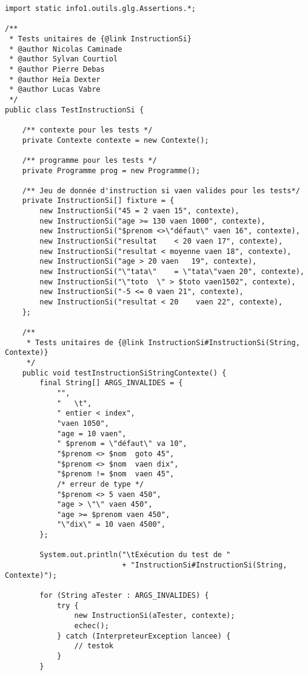 \begin{enum}
\begin{verbatim}
import static info1.outils.glg.Assertions.*;

/**
 * Tests unitaires de {@link InstructionSi}
 * @author Nicolas Caminade
 * @author Sylvan Courtiol
 * @author Pierre Debas
 * @author Heïa Dexter
 * @author Lucas Vabre
 */
public class TestInstructionSi {

    /** contexte pour les tests */
    private Contexte contexte = new Contexte();
    
    /** programme pour les tests */
    private Programme prog = new Programme();
    
    /** Jeu de donnée d'instruction si vaen valides pour les tests*/
    private InstructionSi[] fixture = {
        new InstructionSi("45 = 2 vaen 15", contexte),
        new InstructionSi("age >= 130 vaen 1000", contexte),
        new InstructionSi("$prenom <>\"défaut\" vaen 16", contexte),
        new InstructionSi("resultat    < 20 vaen 17", contexte),
        new InstructionSi("resultat < moyenne vaen 18", contexte),
        new InstructionSi("age > 20 vaen   19", contexte),
        new InstructionSi("\"tata\"    = \"tata\"vaen 20", contexte),
        new InstructionSi("\"toto  \" > $toto vaen1502", contexte),
        new InstructionSi("-5 <= 0 vaen 21", contexte),
        new InstructionSi("resultat < 20    vaen 22", contexte),
    };
    
    /**
     * Tests unitaires de {@link InstructionSi#InstructionSi(String, Contexte)}
     */
    public void testInstructionSiStringContexte() {
        final String[] ARGS_INVALIDES = {
            "",
            "   \t",
            " entier < index",
            "vaen 1050",
            "age = 10 vaen",
            " $prenom = \"défaut\" va 10",
            "$prenom <> $nom  goto 45",
            "$prenom <> $nom  vaen dix",
            "$prenom != $nom  vaen 45",
            /* erreur de type */
            "$prenom <> 5 vaen 450",
            "age > \"\" vaen 450",
            "age >= $prenom vaen 450",
            "\"dix\" = 10 vaen 4500",
        };
        
        System.out.println("\tExécution du test de "
                           + "InstructionSi#InstructionSi(String, Contexte)");
        
        for (String aTester : ARGS_INVALIDES) {
            try {
                new InstructionSi(aTester, contexte);
                echec();
            } catch (InterpreteurException lancee) {
                // testok
            }
        }
        

\end{verbatim}
\end{enum}
